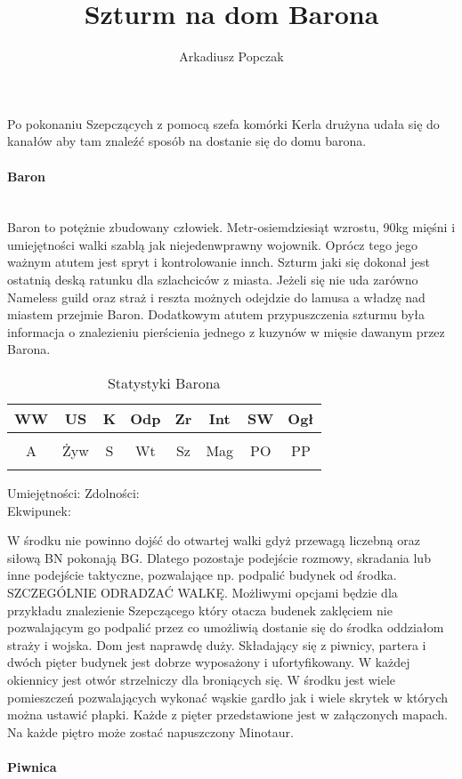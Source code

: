 \documentclass{article}
\title{\Huge{Szturm na dom Barona}}
\author{Arkadiusz Popczak}
\newcommand{\whtable}[1]{
    \begin{table}[H]
        \caption{{#1}}
        \vspace{4pt}
        \centering
            \begin{tabular}{|c|c|c|c|c|c|c|c|}
                \hline
                WW & US & K & Odp & Zr & Int & SW & Ogł \\ \hline
                 &  &  &  &  &  &  &  \\ \hline
                A & Żyw & S & Wt & Sz & Mag & PO & PP \\ \hline
                 &  &  &  &  &  &  &  \\ \hline
                \end{tabular}
    \end{table}

    \noindent
    Umiejętności:
    \hspace{150pt}
    Zdolności:
    \vspace{50pt}\\
    Ekwipunek:
    \vspace{50pt}
}
\begin{document}
\maketitle

Po pokonaniu Szepczących z pomocą szefa komórki Kerla drużyna udała się do kanałów aby tam znaleźć sposób na dostanie się do domu barona. \\
\paragraph{\Large{Baron}}\mbox{}\\

\indent
Baron to potężnie zbudowany człowiek. Metr-osiemdziesiąt wzrostu, 90kg mięśni i umiejętności walki szablą jak niejedenwprawny wojownik. Oprócz tego jego ważnym atutem jest spryt i kontrolowanie innch. Szturm jaki się dokonał jest ostatnią deską ratunku dla szlachciców z miasta. Jeżeli się nie uda zarówno Nameless guild oraz straż i reszta możnych odejdzie do lamusa a władzę nad miastem przejmie Baron. Dodatkowym atutem przypuszczenia szturmu była informacja o znalezieniu pierścienia jednego z kuzynów w mięsie dawanym przez Barona.

\whtable{Statystyki Barona}

W środku nie powinno dojść do otwartej walki gdyż przewagą liczebną oraz siłową BN pokonają BG. Dlatego pozostaje podejście rozmowy, skradania lub inne podejście taktyczne, pozwalające np. podpalić budynek od środka. SZCZEGÓLNIE ODRADZAĆ WALKĘ. Możliwymi opcjami będzie dla przykładu znalezienie Szepczącego który otacza budenek zaklęciem nie pozwalającym go podpalić przez co umożliwią dostanie się do środka oddziałom straży i wojska. Dom jest naprawdę duży. Składający się z piwnicy, partera i dwóch pięter budynek jest dobrze wyposażony i ufortyfikowany. W każdej okiennicy jest otwór strzelniczy dla broniących się. W środku jest wiele pomieszczeń pozwalających wykonać wąskie gardło jak i wiele skrytek w których można ustawić płapki. Każde z pięter przedstawione jest w załączonych mapach. Na każde piętro może zostać napuszczony Minotaur.
\pagebreak
\paragraph{\Large{Piwnica}}\mbox{}\\
\end{document}
